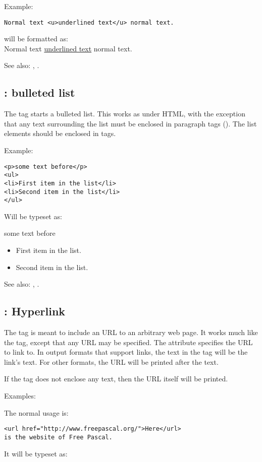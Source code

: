 Example:
\begin{verbatim}
Normal text <u>underlined text</u> normal text.
\end{verbatim}
will be formatted as:\\
Normal text \underline{underlined text} normal text.

See also: , .

\subsection{ : bulleted list}
\label{tag:ul}
The  tag starts a bulleted list. This works as under HTML, with the
exception that any text surrounding the list must be enclosed in paragraph
tags (). The list elements should be enclosed in  tags.

Example:
\begin{verbatim}
<p>some text before</p>
<ul>
<li>First item in the list</li>
<li>Second item in the list</li>
</ul>
\end{verbatim}
Will be typeset as:

some text before
\begin{itemize}
\item First item in the list.
\item Second item in the list.
\end{itemize}

See also: , .


\subsection{ : Hyperlink}
\label{tag:url}
The  tag is meant to include an URL to an arbitrary web page. It
works much like the  tag, except that any URL may be specified.
The attribute  specifies the URL to link to. In output formats
that support links, the text in the  tag will be the link's text.
For other formats, the URL will be printed after the text.

If the  tag does not enclose any text, then the URL itself will
be printed.

Examples:

The normal usage is:
\begin{verbatim}
<url href="http://www.freepascal.org/">Here</url> 
is the website of Free Pascal.
\end{verbatim}
It will be typeset as:

